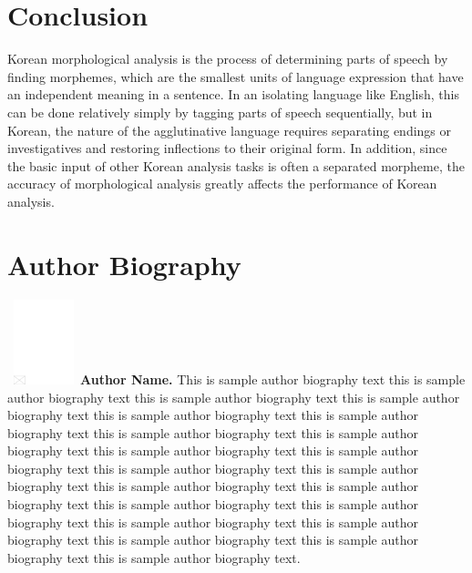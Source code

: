 \documentclass[AMS,STIX2COL]{WileyNJD-v2}
\begin{document}


    \section{Conclusion}\label{sec7}

    Korean morphological analysis is the process of determining parts of speech by finding morphemes, which are the smallest units of language expression that have an independent meaning in a sentence.
    In an isolating language like English, this can be done relatively simply by tagging parts of speech sequentially, but in Korean, the nature of the agglutinative language requires separating endings or investigatives and restoring inflections to their original form.
    In addition, since the basic input of other Korean analysis tasks is often a separated morpheme, the accuracy of morphological analysis greatly affects the performance of Korean analysis.



    

    \section*{Author Biography}

    \begin{biography}{\includegraphics[width=60pt,height=70pt,draft]{empty}}{\textbf{Author Name.} This is sample author biography text this is sample author biography text this is sample author biography text this is sample author biography text this is sample author biography text this is sample author biography text this is sample author biography text this is sample author biography text this is sample author biography text this is sample author biography text this is sample author biography text this is sample author biography text this is sample author biography text this is sample author biography text this is sample author biography text this is sample author biography text this is sample author biography text this is sample author biography text this is sample author biography text this is sample author biography text this is sample author biography text.}
    \end{biography}
\end{document}
